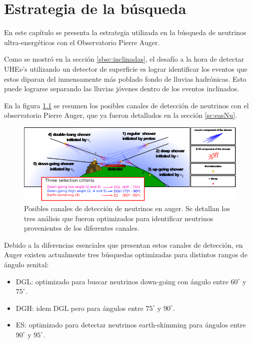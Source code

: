 \chapter{Estrategia de la búsqueda}
\label{ch:estrategiaAuger}

En este capítulo se presenta la estrategia utilizada en la búsqueda de neutrinos ultra-energéticos con el Observatorio Pierre Auger.

Como se mostró en la sección \ref{sbsc:inclinadas}, el desafío a la hora de detectar UHE$\nu$'s utilizando un detector de superficie es lograr identificar los eventos que estos diparan del inmensamente más poblado fondo de lluvias hadrónicas.
Esto puede lograrse separando las lluvias jóvenes dentro de los eventos inclinados.

En la figura \ref{fig:augerNu} se resumen los posibles canales de detección de neutrinos con el observatorio Pierre Auger, que ya fueron detallados en la sección \ref{sc:easNu}.
	\begin{figure}[ht!]
		\centering
		\includegraphics[width=\textwidth]{./fig/estrategiaAuger/auger_nu}
		\caption{\label{fig:augerNu}
		Posibles canales de detección de neutrinos en auger. Se detallan los tres análisis que fueron optimizados para identificar neutrinos provenientes de los diferentes canales.
		}
	\end{figure}
Debido a la diferencias esenciales que presentan estos canales de detección, en Auger existen actualmente tres búsquedas optimizadas para distintos rangos de ángulo zenital:
\begin{itemize}
 \item DGL: optimizado para buscar neutrinos down-going con ángulo entre $60^\circ$ y $75^\circ$.
 \item DGH: idem DGL pero para ángulos entre $75^\circ$ y $90^\circ$. 
 \item ES: optimizado para detectar neutrinos earth-skimming para ángulos entre $90^\circ$ y $95^\circ$.
\end{itemize}

